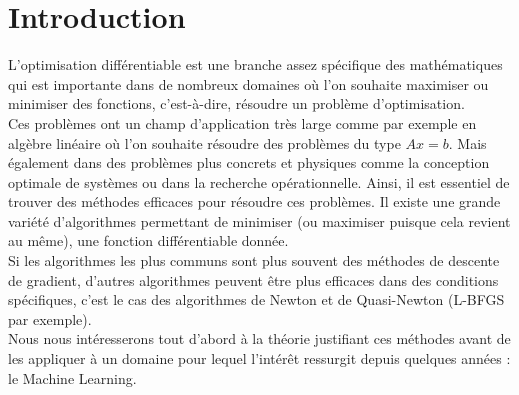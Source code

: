 \chapter{Introduction}
L'optimisation différentiable est une branche assez spécifique des mathématiques qui est importante dans de nombreux domaines où l'on souhaite maximiser ou minimiser des fonctions, c'est-à-dire, résoudre un problème d'optimisation.\\

 Ces problèmes ont un champ d'application très large comme par exemple en algèbre linéaire où l'on souhaite résoudre des problèmes du type $Ax=b$. Mais également dans des problèmes plus concrets et physiques comme la conception optimale de systèmes ou dans la recherche opérationnelle. Ainsi, il est essentiel de trouver des méthodes efficaces pour résoudre ces problèmes. Il existe une grande variété d'algorithmes permettant de minimiser (ou maximiser puisque cela revient au même), une fonction différentiable donnée.\\

 Si les algorithmes les plus communs sont plus souvent des méthodes de descente de gradient, d'autres algorithmes peuvent être plus efficaces dans des conditions spécifiques, c'est le cas des algorithmes de Newton et de Quasi-Newton (L-BFGS par exemple).\\


Nous nous intéresserons tout d'abord à la théorie justifiant ces méthodes avant de les appliquer à un domaine pour lequel l'intérêt ressurgit depuis quelques années : le Machine Learning.
